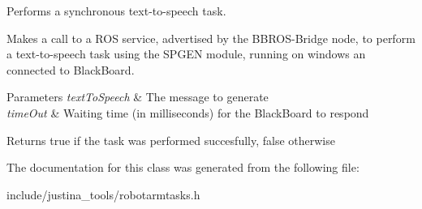 Performs a synchronous text-\/to-\/speech task. 

Makes a call to a R\+OS service, advertised by the B\+B\+R\+O\+S-\/\+Bridge node, to perform a text-\/to-\/speech task using the S\+P\+G\+EN module, running on windows an connected to Black\+Board.


\begin{DoxyParams}{Parameters}
{\em text\+To\+Speech} & The message to generate \\
\hline
{\em time\+Out} & Waiting time (in milliseconds) for the Black\+Board to respond \\
\hline
\end{DoxyParams}
\begin{DoxyReturn}{Returns}
true if the task was performed succesfully, false otherwise 
\end{DoxyReturn}


The documentation for this class was generated from the following file\+:\begin{DoxyCompactItemize}
\item 
include/justina\+\_\+tools/robotarmtasks.\+h\end{DoxyCompactItemize}
